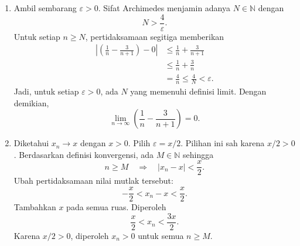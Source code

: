 \documentclass[11pt,a4paper]{article}
\newcommand{\N}{\mathbb{N}}
\begin{document}
\begin{enumerate}[itemsep=12pt,parsep=5pt]
\begin{enumerate}
                Ambil sembarang batas bawah $\ell$ dari $aS$.
                Untuk setiap $s\in S$, berlaku $\ell\le as$.
                Bagi kedua ruas dengan $a<0$:
                \[
                  \frac{\ell}{a}\ge s.
                \]
                Maka, $\ell/a$ merupakan batas atas $S$.
                Karena $M$ adalah batas atas terkecil,
                \[
                  M\le\frac{\ell}{a}\implies aM\ge\ell
                \]
                Jadi, setiap batas bawah $aS$ tidak lebih besar dari $aM$.
                Dengan demikian,
                \[
                  \inf(aS)=aM=a\sup(S).
                \]
        \end{enumerate}

  \item Ambil sembarang $\varepsilon>0$.
        Sifat Archimedes menjamin adanya $N\in\N$ dengan
        \[
          N>\frac{4}{\varepsilon}.
        \]
        Untuk setiap $n\ge N$, pertidaksamaan segitiga memberikan
        \begin{align*}
          \left|\left(\frac{1}{n}-\frac{3}{n+1}\right)-0\right|
           & \le\frac{1}{n}+\frac{3}{n+1}            \\
           & \le\frac{1}{n}+\frac{3}{n}              \\
           & =\frac{4}{n}\le\frac{4}{N}<\varepsilon.
        \end{align*}
        Jadi, untuk setiap $\varepsilon>0$, ada $N$ yang memenuhi definisi limit.
        Dengan demikian,
        \[
          \lim_{n\to\infty}\left(\frac{1}{n}-\frac{3}{n+1}\right)=0.
        \]

  \item Diketahui $x_n\to x$ dengan $x>0$.
        Pilih $\varepsilon=x/2$.
        Pilihan ini sah karena $x/2>0$.
        Berdasarkan definisi konvergensi, ada $M\in\N$ sehingga
        \[
          n\ge M\quad\Longrightarrow\quad |x_n-x|<\frac{x}{2}.
        \]
        Ubah pertidaksamaan nilai mutlak tersebut:
        \[
          -\frac{x}{2}<x_n-x<\frac{x}{2}.
        \]
        Tambahkan $x$ pada semua ruas.
        Diperoleh
        \[
          \frac{x}{2}<x_n<\frac{3x}{2}.
        \]
        Karena $x/2>0$, diperoleh $x_n>0$ untuk semua $n\ge M$.
\end{enumerate}
\end{document}
